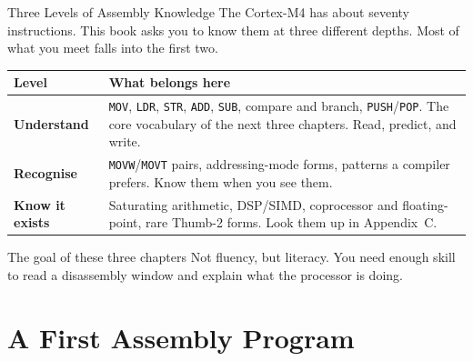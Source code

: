 \documentclass[9pt,aspectratio=169,xcolor=table]{beamer}
\begin{document}
\begin{frame}{Three Levels of Assembly Knowledge}
    \leavevmode
    {\small The Cortex-M4 has about \alert{seventy} instructions. This book
    asks you to know them at three different depths. Most of what you meet
    falls into the first two.}

    \vspace{3mm}
    \begin{center}
    {\small
    \striped
    \begin{tabular}{@{}l R{.68\textwidth}@{}}
        \toprule
        \textbf{Level} & \textbf{What belongs here} \\
        \midrule
        \textbf{Understand}
        & \texttt{MOV}, \texttt{LDR}, \texttt{STR}, \texttt{ADD}, \texttt{SUB},
          compare and branch, \texttt{PUSH}/\texttt{POP}. The core vocabulary
          of the next three chapters. Read, predict, and write. \\
        \textbf{Recognise}
        & \texttt{MOVW}/\texttt{MOVT} pairs, addressing-mode forms, patterns a
          compiler prefers. Know them when you see them. \\
        \textbf{Know it exists}
        & Saturating arithmetic, DSP/SIMD, coprocessor and floating-point,
          rare Thumb-2 forms. Look them up in Appendix~C. \\
        \bottomrule
    \end{tabular}}
    \end{center}

    \vspace{3mm}
    \begin{block}{The goal of these three chapters}
        Not fluency, but \alert{literacy}. You need enough skill to read a
        disassembly window and explain what the processor is doing.
    \end{block}
\end{frame}


\section{A First Assembly Program}
\end{document}
